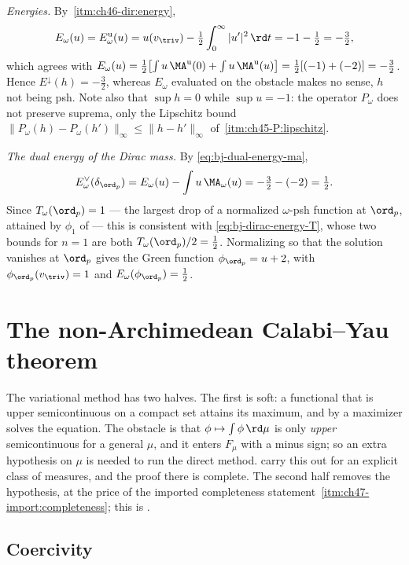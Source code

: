 \begin{example}
\emph{Energies.}  By
\,\cref{itm:ch46-dir:energy},
\[
 E_\omega(u)=E^{\mathrm u}_\omega(u)
 =u(v_{\triv})-\tfrac12\int_0^\infty|u'|^2\,\rd t
 =-1-\tfrac12=-\tfrac32,
\]
which agrees with
$E_\omega(u)=\tfrac12\bigl[\int u\,\MA^{\mathrm u}(0)+\int u\,\MA^{\mathrm u}(u)\bigr]
=\tfrac12[(-1)+(-2)]=-\tfrac32$.  Hence
$E^\downarrow(h)=-\tfrac32$, whereas $E_\omega$ evaluated on the
obstacle makes no sense, $h$ not being psh.  Note also that
$\sup h=0$ while $\sup u=-1$: the operator $P_\omega$ does not
preserve suprema, only the Lipschitz bound
$\lVert P_\omega(h)-P_\omega(h')\rVert_\infty\le\lVert h-h'\rVert_\infty$
of \,\cref{itm:ch45-P:lipschitz}.

\emph{The dual energy of the Dirac mass.}  By
\eqref{eq:bj-dual-energy-ma},
\[
 E^\vee_\omega(\delta_{\ord_p})=E_\omega(u)-\int u\,\MA_\omega(u)
 =-\tfrac32-(-2)=\tfrac12 .
\]
Since $T_\omega(\ord_p)=1$ --- the largest drop of a normalized
$\omega$-psh function at $\ord_p$, attained by $\phi_1$ of
 --- this is consistent with
\eqref{eq:bj-dirac-energy-T}, whose two bounds for $n=1$ are both
$T_\omega(\ord_p)/2=\tfrac12$.  Normalizing so that the solution vanishes
at $\ord_p$ gives the Green function $\phi_{\ord_p}=u+2$, with
$\phi_{\ord_p}(v_{\triv})=1$ and $E_\omega(\phi_{\ord_p})=\tfrac12$.
\end{example}

\section{The non-Archimedean Calabi--Yau theorem}
\label{sec:ch47-cy}

The variational method has two halves.  The first is soft: a functional
that is upper semicontinuous on a compact set attains its maximum, and by
 a maximizer solves the equation.  The
obstacle is that $\phi\mapsto\int\phi\,\rd\mu$ is only \emph{upper}
semicontinuous for a general $\mu$, and it enters $F_\mu$ with a minus
sign; so an extra hypothesis on $\mu$ is needed to run the direct method.
 carry this out for an explicit
class of measures, and the proof there is complete.  The second half
removes the hypothesis, at the price of the imported completeness statement
\,\cref{itm:ch47-import:completeness}; this is
.

\subsection{Coercivity}
\label{sec:ch47-coercivity}

